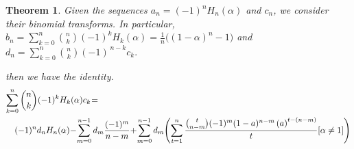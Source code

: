 \documentclass[a4paper,10pt,oneside]{article}
\newtheorem{theorem}{Theorem}[section]
\theoremstyle{definition}
\theoremstyle{remark}
\begin{document}
 \begin{theorem}
\label{theoremNew version}
Given the sequences $a_n = (-1)^n H_n(\alpha)$ and $c_n$, we consider their binomial transforms. In particular,  
$
b_n  = \sum_{k = 0}^n \binom{n}{k} (-1)^k H_k(\alpha)= \frac{1}{n}\big((1 - \alpha)^n - 1\big)
$
and
$
d_n = \sum_{k = 0}^n \binom{n}{k} (-1)^{\,n-k} c_k.
$

then we have the identity.
\begin{eqnarray}
 \lefteqn{\sum_{k=0}^n\binom{n}{k}(-1)^kH_k(\alpha)c_k\hspace{-2pt}=}\nonumber\\
&&{(-1)^n}d_nH_n{(\alpha)}\hspace{-2pt}-\hspace{-2pt}\sum_{m=0}^{n-1}d_m\frac{(-1)^{m}}{n-m}\hspace{-2pt}+\hspace{-2pt} \sum_{m=0}^{n-1}d_m\hspace{-2pt}\left(\sum_{t=1}^{n}\frac{\binom{t}{n-m}(-1)^m(1-a)^{n-m}\left(a\right)^{t-(n-m)}}{t}[\alpha\ne 1]\right)\\\label{eqnnew8}
\end{eqnarray}
\end{theorem}
\end{document}
